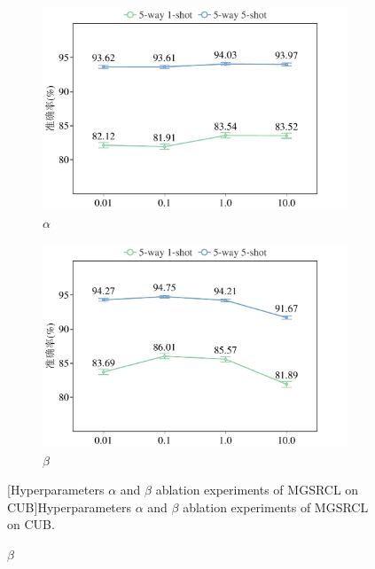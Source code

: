 \begin{figure}[h!]
\centering
{}
\begin{subfigure}{0.495\columnwidth}
\includegraphics[width=\columnwidth]{figures/MGSRCL/CUB/alpha.pdf}
\caption{$\alpha$}
\label{figure3: alpha(CUB)}
\end{subfigure}
\begin{subfigure}{0.495\columnwidth}
\includegraphics[width=\columnwidth]{figures/MGSRCL/CUB/beta.pdf}
\caption{$\beta$}
\label{figure3: beta(CUB)}
\end{subfigure}
[Hyperparameters $\alpha$ and $\beta$ ablation experiments of MGSRCL on CUB]{Hyperparameters $\alpha$ and $\beta$ ablation experiments of MGSRCL on CUB.}
\label{figure3: alpha and beta (CUB)}
\end{figure}


